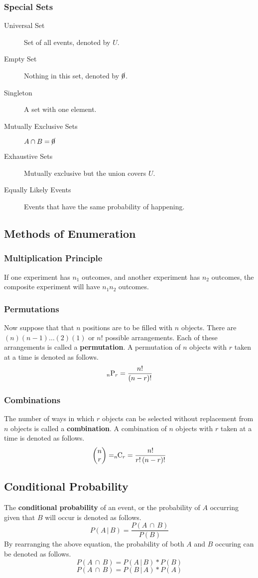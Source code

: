 \documentclass{article}
\begin{document}
\subsubsection*{Special Sets}
\begin{description}
\item[Universal Set] Set of all events, denoted by \(U\).
\item[Empty Set] Nothing in this set, denoted by \(\cancel{0}\).
\item[Singleton] A set with one element.
\item[Mutually Exclusive Sets] \(A \cap B = \cancel{0}\)
\item[Exhaustive Sets] Mutually exclusive but the union covers \(U\).
\item[Equally Likely Events] Events that have the same probability of happening.
\end{description}
\subsection{Methods of Enumeration}
\subsubsection*{Multiplication Principle}
If one experiment has \(n_1\) outcomes, and another experiment has \(n_2\) outcomes, the composite experiment will have \(n_1n_2\) outcomes.
\subsubsection*{Permutations}
Now suppose that that \(n\) positions are to be filled with \(n\) objects. There are \((n)(n-1)\hdots(2)(1)\) or \(n!\) possible arrangements. Each of these arrangements is called a \textbf{permutation}. A permutation of \(n\) objects with \(r\) taken at a time is denoted as follows.
\[_n\textnormal{P}_r=\frac{n!}{(n-r)!}\]
\subsubsection*{Combinations}
The number of ways in which \(r\) objects can be selected without replacement from \(n\) objects is called a \textbf{combination}. A combination of \(n\) objects with \(r\) taken at a time is denoted as follows.
\[\left(\begin{matrix}n\\r\end{matrix}\right)=_n\!\!\textnormal{C}_r=\frac{n!}{r!\,(n-r)!}\]
\subsection{Conditional Probability}
The \textbf{conditional probability} of an event, or the probability of \(A\) occurring given that \(B\) will occur is denoted as follows.
\[P(A\,|\,B)=\frac{P(A\,\cap\,B)}{P(B)}\]
By rearranging the above equation, the probability of both \(A\) and \(B\) occuring can be denoted as follows.
\[P(A\,\cap\,B)=P(A\,|\,B)*P(B)\]
\[P(A\,\cap\,B)=P(B\,|\,A)*P(A)\]
\end{document}
